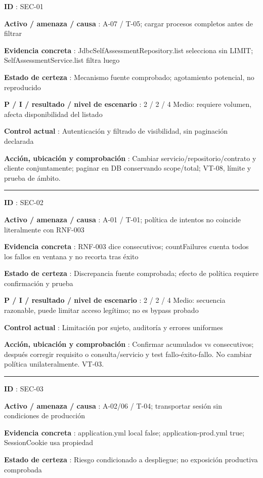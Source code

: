 \documentclass[12pt,a4paper]{report}
\begin{document}
\textbf{ID }: SEC-01

\textbf{Activo / amenaza / causa }: A-07 / T-05; cargar procesos
completos antes de filtrar

\textbf{Evidencia concreta }: JdbcSelfAssessmentRepository.list
selecciona sin LIMIT; SelfAssessmentService.list filtra luego

\textbf{Estado de certeza }: Mecanismo fuente comprobado; agotamiento
potencial, no reproducido

\textbf{P / I / resultado / nivel de escenario }: 2 / 2 / 4 Medio:
requiere volumen, afecta disponibilidad del listado

\textbf{Control actual }: Autenticación y filtrado de visibilidad, sin
paginación declarada

\textbf{Acción, ubicación y comprobación }: Cambiar
servicio/repositorio/contrato y cliente conjuntamente; paginar en DB
conservando scope/total; VT-08, límite y prueba de ámbito.

\medskip\hrule\medskip

\textbf{ID }: SEC-02

\textbf{Activo / amenaza / causa }: A-01 / T-01; política de intentos no
coincide literalmente con RNF-003

\textbf{Evidencia concreta }: RNF-003 dice consecutivos; countFailures
cuenta todos los fallos en ventana y no recorta tras éxito

\textbf{Estado de certeza }: Discrepancia fuente comprobada; efecto de
política requiere confirmación y prueba

\textbf{P / I / resultado / nivel de escenario }: 2 / 2 / 4 Medio:
secuencia razonable, puede limitar acceso legítimo; no es bypass probado

\textbf{Control actual }: Limitación por sujeto, auditoría y errores
uniformes

\textbf{Acción, ubicación y comprobación }: Confirmar acumulados vs
consecutivos; después corregir requisito o consulta/servicio y test
fallo-éxito-fallo. No cambiar política unilateralmente. VT-03.

\medskip\hrule\medskip

\textbf{ID }: SEC-03

\textbf{Activo / amenaza / causa }: A-02/06 / T-04; transportar sesión
sin condiciones de producción

\textbf{Evidencia concreta }: application.yml local false;
application-prod.yml true; SessionCookie usa propiedad

\textbf{Estado de certeza }: Riesgo condicionado a despliegue; no
exposición productiva comprobada
\end{document}
